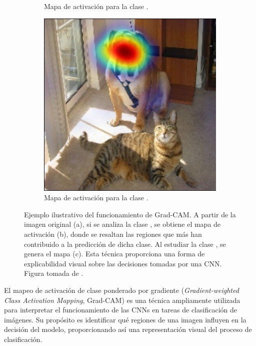 \begin{figure}[h]
\begin{subfigure}{0.28\textwidth}
        \caption{Mapa de activación para la clase .}
        \label{fig__grad_cam__cat}
    \end{subfigure}  
    \begin{subfigure}{0.28\textwidth}
        \includegraphics[width=\textwidth]{figures/2_theory/grad_cam__dog.jpg}
        \caption{Mapa de activación para la clase .}
        \label{fig__grad_cam__dog}
    \end{subfigure}    
    \caption[Ejemplo de funcionamiento de Grad-CAM]{Ejemplo ilustrativo del funcionamiento de Grad-CAM. A partir de la imagen original (a), si se analiza la clase , se obtiene el mapa de activación (b), donde se resaltan las regiones que más han contribuido a la predicción de dicha clase. Al estudiar la clase , se genera el mapa (c). Esta técnica proporciona una forma de explicabilidad visual sobre las decisiones tomadas por una CNN. Figura tomada de \cite{selvaraju_grad_cam_2017}.}   
    \label{fig__grad_cam}  
\end{figure}

El mapeo de activación de clase ponderado por gradiente (\textit{Gradient-weighted Class Activation Mapping}, Grad-CAM) \cite{selvaraju_grad_cam_2017} es una técnica ampliamente utilizada para interpretar el funcionamiento de las CNNs en tareas de clasificación de imágenes. Su propósito es identificar qué regiones de una imagen influyen en la decisión del modelo, proporcionando así una representación visual del proceso de clasificación.

